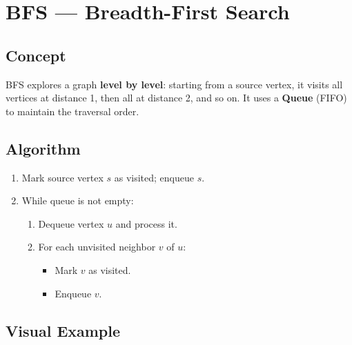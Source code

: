 \documentclass[12pt,a4paper]{article}
\begin{document}
\newpage

\section{BFS — Breadth-First Search}

\subsection{Concept}
BFS explores a graph \textbf{level by level}: starting from a source vertex, it visits all vertices at distance 1, then all at distance 2, and so on. It uses a \textbf{Queue} (FIFO) to maintain the traversal order.

\subsection{Algorithm}

\begin{enumerate}
    \item Mark source vertex $s$ as visited; enqueue $s$.
    \item While queue is not empty:
    \begin{enumerate}
        \item Dequeue vertex $u$ and process it.
        \item For each unvisited neighbor $v$ of $u$:
        \begin{itemize}
            \item Mark $v$ as visited.
            \item Enqueue $v$.
        \end{itemize}
    \end{enumerate}
\end{enumerate}

\subsection{Visual Example}

\begin{center}
\end{center}
\end{document}
